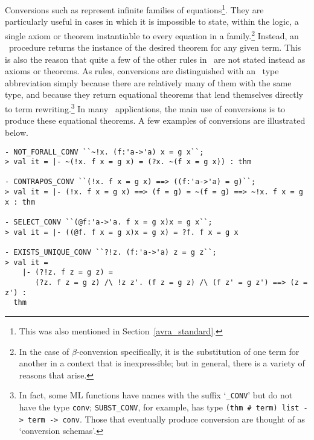 Conversions such as 
represent infinite families of equations\footnote{This was also
  mentioned in Section~\ref{avra_standard}.}. They are particularly
useful in cases in which it is impossible to state, within the logic,
a single axiom or theorem instantiable to every equation in a
family.\footnote{In the case of
  $\beta$-conversion specifically, it is the substitution of one term
  for another in a context that is inexpressible; but in general,
  there is a variety of reasons that arise.} Instead, an \ML\
procedure returns the instance of the desired theorem for any given
term. This is also the reason that quite a few of the other rules in
\HOL\ are not stated instead as axioms or theorems. As rules,
conversions are distinguished with an \ML\ type abbreviation simply
because there are relatively many of them with the same type, and
because they return equational\index{theorems, in HOL logic@theorems,
  in \HOL\ logic!equational}
theorems that lend themselves directly to term rewriting.\footnote{In
  fact, some ML functions have names with the suffix `{\tt \_CONV}'
  but do not have the type {\tt conv}; {\tt SUBST\_CONV}, for example,
  has type {\tt (thm \# term) list -> term -> conv}. Those that
  eventually produce conversion are thought of as `conversion
  schemas'.} In many \HOL\ applications, the main use of conversions
is to produce these equational theorems.  A few examples of
conversions are illustrated below.

\setcounter{sessioncount}{1}
\begin{session}
\begin{verbatim}
- NOT_FORALL_CONV ``~!x. (f:'a->'a) x = g x``;
> val it = |- ~(!x. f x = g x) = (?x. ~(f x = g x)) : thm

- CONTRAPOS_CONV ``(!x. f x = g x) ==> ((f:'a->'a) = g)``;
> val it = |- (!x. f x = g x) ==> (f = g) = ~(f = g) ==> ~!x. f x = g x : thm

- SELECT_CONV ``(@f:'a->'a. f x = g x)x = g x``;
> val it = |- ((@f. f x = g x)x = g x) = ?f. f x = g x

- EXISTS_UNIQUE_CONV ``?!z. (f:'a->'a) z = g z``;
> val it =
    |- (?!z. f z = g z) =
       (?z. f z = g z) /\ !z z'. (f z = g z) /\ (f z' = g z') ==> (z = z') :
  thm
\end{verbatim}
\end{session}

